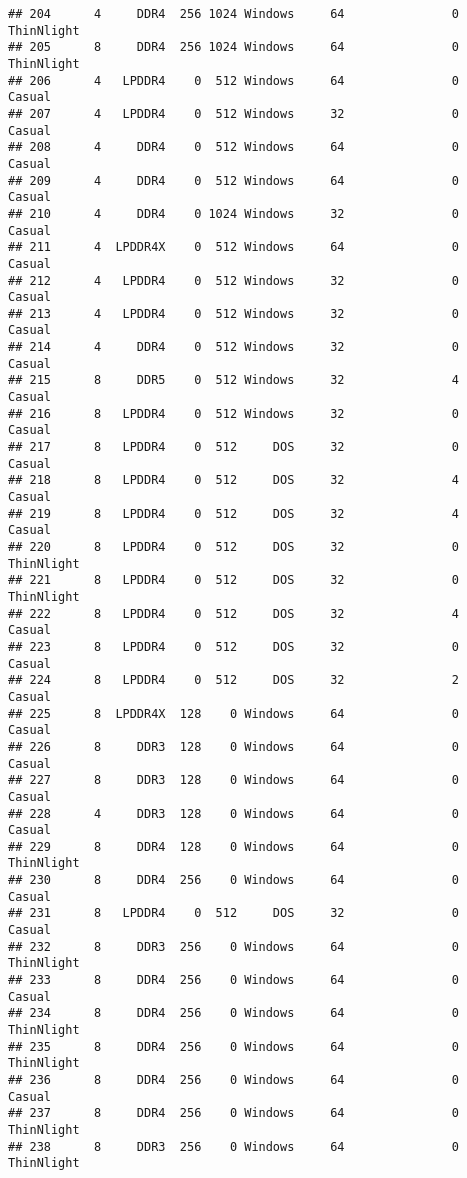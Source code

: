 \documentclass[
]{article}
\begin{document}
\begin{verbatim}
## 204      4     DDR4  256 1024 Windows     64               0 ThinNlight
## 205      8     DDR4  256 1024 Windows     64               0 ThinNlight
## 206      4   LPDDR4    0  512 Windows     64               0     Casual
## 207      4   LPDDR4    0  512 Windows     32               0     Casual
## 208      4     DDR4    0  512 Windows     64               0     Casual
## 209      4     DDR4    0  512 Windows     64               0     Casual
## 210      4     DDR4    0 1024 Windows     32               0     Casual
## 211      4  LPDDR4X    0  512 Windows     64               0     Casual
## 212      4   LPDDR4    0  512 Windows     32               0     Casual
## 213      4   LPDDR4    0  512 Windows     32               0     Casual
## 214      4     DDR4    0  512 Windows     32               0     Casual
## 215      8     DDR5    0  512 Windows     32               4     Casual
## 216      8   LPDDR4    0  512 Windows     32               0     Casual
## 217      8   LPDDR4    0  512     DOS     32               0     Casual
## 218      8   LPDDR4    0  512     DOS     32               4     Casual
## 219      8   LPDDR4    0  512     DOS     32               4     Casual
## 220      8   LPDDR4    0  512     DOS     32               0 ThinNlight
## 221      8   LPDDR4    0  512     DOS     32               0 ThinNlight
## 222      8   LPDDR4    0  512     DOS     32               4     Casual
## 223      8   LPDDR4    0  512     DOS     32               0     Casual
## 224      8   LPDDR4    0  512     DOS     32               2     Casual
## 225      8  LPDDR4X  128    0 Windows     64               0     Casual
## 226      8     DDR3  128    0 Windows     64               0     Casual
## 227      8     DDR3  128    0 Windows     64               0     Casual
## 228      4     DDR3  128    0 Windows     64               0     Casual
## 229      8     DDR4  128    0 Windows     64               0 ThinNlight
## 230      8     DDR4  256    0 Windows     64               0     Casual
## 231      8   LPDDR4    0  512     DOS     32               0     Casual
## 232      8     DDR3  256    0 Windows     64               0 ThinNlight
## 233      8     DDR4  256    0 Windows     64               0     Casual
## 234      8     DDR4  256    0 Windows     64               0 ThinNlight
## 235      8     DDR4  256    0 Windows     64               0 ThinNlight
## 236      8     DDR4  256    0 Windows     64               0     Casual
## 237      8     DDR4  256    0 Windows     64               0 ThinNlight
## 238      8     DDR3  256    0 Windows     64               0 ThinNlight

\end{verbatim}
\end{document}
